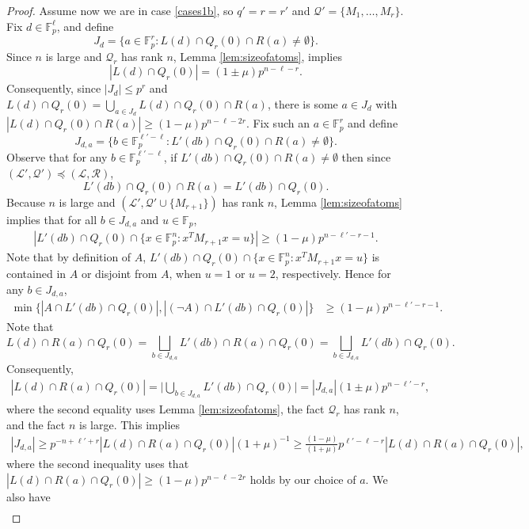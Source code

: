 \documentclass[12pt,oneside,british,a4wide]{amsart}
\numberwithin{equation}{section}
\theoremstyle{definition}
\def\F{\mathbb{F}}
\newcommand{\calL}{\mathcal{L}}
\newcommand{\calQ}{\mathcal{Q}}
\newcommand{\calR}{\mathcal{R}}
\begin{document}
\begin{proof}
Assume now we are in case \ref{cases1b}, so $q'=r=r'$ and $\calQ'=\{M_1,\ldots, M_r\}$.  Fix $d\in \F_p^{\ell}$, and define 
$$
J_{d}=\{a\in \mathbb{F}_p^r: L(d)\cap Q_{r}(0)\cap R(a)\neq \emptyset\}.
$$
Since $n$ is large and $\calQ_r$ has rank $n$, Lemma \ref{lem:sizeofatoms}, implies  
$$
|L(d)\cap Q_{r}(0)|=(1\pm \mu)p^{n-\ell-r}.
$$
Consequently, since $|J_{d}|\leq p^r$ and $L(d)\cap Q_{r}(0)=\bigcup_{a\in J_{d}}L(d)\cap Q_{r}(0)\cap R(a)$, there is some $a\in J_{d}$ with $|L(d)\cap Q_{r}(0)\cap R(a)|\geq (1-\mu)p^{n-\ell-2r}$.    Fix such an $a\in \F_p^r$ and define 
\[J_{d,a}=\{b\in \mathbb{F}_p^{\ell'-\ell}: L'(db)\cap Q_{r}(0)\cap R(a)\neq \emptyset\}.\]
Observe that for any $b\in \F_p^{\ell'-\ell}$, if $L'(db)\cap Q_{r}(0)\cap R(a)\neq \emptyset$ then since $(\calL',\calQ')\preceq (\calL,\calR)$, 
$$
L'(db)\cap Q_{r}(0)\cap R(a)=L'(db)\cap Q_{r}(0).
$$
Because $n$ is large and $(\calL',\calQ'\cup \{M_{r+1}\})$ has rank $n$,  Lemma \ref{lem:sizeofatoms} implies that for all $b\in J_{d,a}$ and $u\in \F_p$,
\begin{align*}
 |L'(db)\cap Q_{r}(0)\cap \{x\in \mathbb{F}_p^n: x^TM_{r+1}x=u\}|\geq (1-\mu)p^{n-\ell'-r-1}.
\end{align*}
Note that by definition of $A$, $L'(db)\cap Q_{r}(0) \cap \{x\in \mathbb{F}_p^n: x^TM_{r+1}x=u\}$ is contained in $A$ or disjoint from $A$, when $u=1$ or $u=2$, respectively. Hence for any $b\in J_{d,a}$,
\begin{align}\label{alqLB}
\min\{|A\cap L'(db)\cap Q_{r}(0)|, |(\neg A)\cap L'(db)\cap Q_{r}(0)|\}&\geq (1-\mu)p^{n-\ell'-r-1}.
\end{align}
Note that 
$$
L(d)\cap R(a)\cap Q_{r}(0)=\bigsqcup_{b\in J_{d,a}}L'(db)\cap R(a)\cap Q_{r}(0)=\bigsqcup_{b\in J_{d,a}}L'(db)\cap Q_{r}(0).
$$
 Consequently, 
 \begin{align}\label{lrq}
|L(d)\cap R(a)\cap Q_{r}(0)|=\Big|\bigcup_{b\in J_{d,a}}L'(db)\cap Q_{r}(0)\Big|=|J_{d,a}|(1\pm \mu )p^{n-\ell'-r},
\end{align}
where the second equality uses Lemma \ref{lem:sizeofatoms}, the fact $\calQ_r$ has rank $n$, and the fact $n$ is large.  This implies 
\begin{align}\label{jadbound}
|J_{d,a}|\geq p^{-n+\ell'+r}|L(d)\cap R(a)\cap Q_{r}(0)|(1+ \mu)^{-1}\geq \frac{(1-\mu)}{(1+\mu)}p^{\ell'-\ell-r}|L(d)\cap R(a)\cap Q_{r}(0)|,
\end{align}
where the second inequality uses that $|L(d)\cap R(a)\cap Q_{r}(0)|\geq (1-\mu)p^{n-\ell-2r}$ holds by our choice of $a$.  We also have 
 \begin{align*}

\end{align*}
\end{proof}
\end{document}
